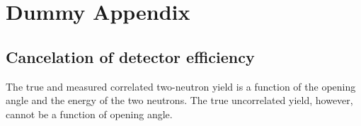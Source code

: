 \chapter{Dummy Appendix}
\section{Cancelation of detector efficiency}
The true and measured correlated two-neutron yield is a function of the opening angle and the energy of the two neutrons.
The true uncorrelated yield, however, cannot be  a function of  opening angle.
